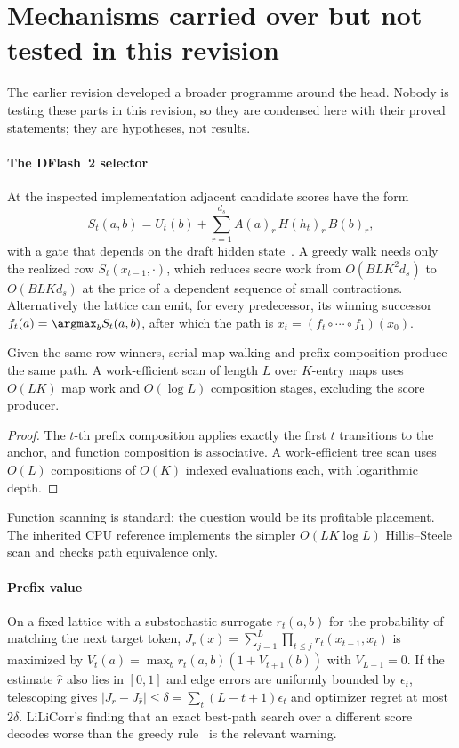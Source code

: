 \section{Mechanisms carried over but not tested in this revision}\label{app:untested}
The earlier revision developed a broader programme around the head. Nobody is testing these parts in this revision, so they are condensed here with their proved statements; they are hypotheses, not results.

\paragraph{The DFlash~2 selector} At the inspected implementation adjacent candidate scores have the form
\begin{equation}
S_t(a,b)=U_t(b)+\sum_{r=1}^{d_s}A(a)_r\,H(h_t)_r\,B(b)_r,\label{eq:selector}
\end{equation}
with a gate that depends on the draft hidden state~\cite{dflash,sgcode}. A greedy walk needs only the realized row $S_t(x_{t-1},\cdot)$, which reduces score work from $O(BLK^2d_s)$ to $O(BLKd_s)$ at the price of a dependent sequence of small contractions. Alternatively the lattice can emit, for every predecessor, its winning successor $f_t(a)=\argmax_bS_t(a,b)$, after which the path is $x_t=(f_t\circ\cdots\circ f_1)(x_0)$.

\begin{proposition}\label{prop:maps}
Given the same row winners, serial map walking and prefix composition produce the same path. A work-efficient scan of length $L$ over $K$-entry maps uses $O(LK)$ map work and $O(\log L)$ composition stages, excluding the score producer.
\end{proposition}
\begin{proof}
The $t$-th prefix composition applies exactly the first $t$ transitions to the anchor, and function composition is associative. A work-efficient tree scan uses $O(L)$ compositions of $O(K)$ indexed evaluations each, with logarithmic depth.
\end{proof}
Function scanning is standard; the question would be its profitable placement. The inherited CPU reference implements the simpler $O(LK\log L)$ Hillis--Steele scan and checks path equivalence only.

\paragraph{Prefix value} On a fixed lattice with a substochastic surrogate $r_t(a,b)$ for the probability of matching the next target token, $J_r(x)=\sum_{j=1}^{L}\prod_{t\le j}r_t(x_{t-1},x_t)$ is maximized by $V_t(a)=\max_br_t(a,b)(1+V_{t+1}(b))$ with $V_{L+1}=0$. If the estimate $\hat r$ also lies in $[0,1]$ and edge errors are uniformly bounded by $\epsilon_t$, telescoping gives $|J_r-J_{\hat r}|\le\delta=\sum_t(L-t+1)\epsilon_t$ and optimizer regret at most $2\delta$. LiLiCorr's finding that an exact best-path search over a different score decodes worse than the greedy rule~\cite{lilicorr} is the relevant warning.

